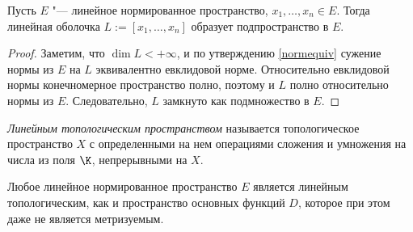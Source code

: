 \begin{corollary}\label{closeness-subspace}
	Пусть $E$ "--- линейное нормированное пространство, $x_1, \dotsc, x_n \in E$. Тогда линейная оболочка $L := [x_1, \dotsc, x_n]$ образует подпространство в $E$.
\end{corollary}

\begin{proof}
	Заметим, что $\dim L < +\infty$, и по утверждению \ref{normequiv} сужение нормы из $E$ на $L$ эквивалентно евклидовой норме. Относительно евклидовой нормы конечномерное пространство полно, поэтому и $L$ полно относительно нормы из $E$. Следовательно, $L$ замкнуто как подмножество в $E$.
\end{proof}

\begin{definition}
	\textit{Линейным топологическим пространством} называется топологическое пространство $X$ с определенными на нем операциями сложения и умножения на числа из поля $\K$, непрерывными на $X$.
\end{definition}

\begin{example}
	Любое линейное нормированное пространство $E$ является линейным топологическим, как и пространство основных функций $D$, которое при этом даже не является метризуемым.
\end{example}
